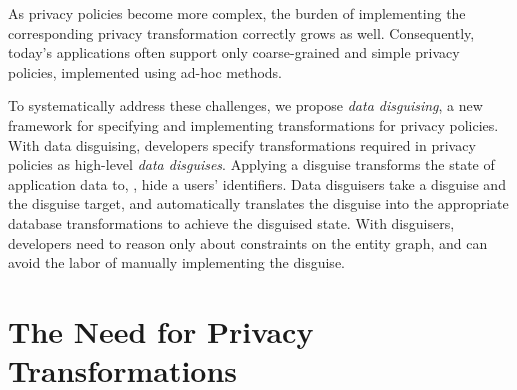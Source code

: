 As privacy policies become more complex, the burden of implementing the corresponding privacy
transformation correctly grows as well.  Consequently, today's applications often support only
coarse-grained and simple privacy policies, implemented using ad-hoc methods.


To systematically address these challenges, we propose \emph{data disguising}, a new framework for
specifying and implementing transformations for privacy policies.
%
With data disguising, developers specify transformations required in privacy policies as high-level \emph{data
disguises}. Applying a disguise transforms the state of application data to, \eg, hide a users'
identifiers.
%
%
Data disguisers take a disguise and the disguise target, and automatically translates the
disguise into the appropriate database transformations to achieve the disguised state. With
disguisers, developers need to reason only about constraints on the entity graph, and can avoid the
labor of manually implementing the disguise.

\section{The Need for Privacy Transformations}
\label{sec:survey}

